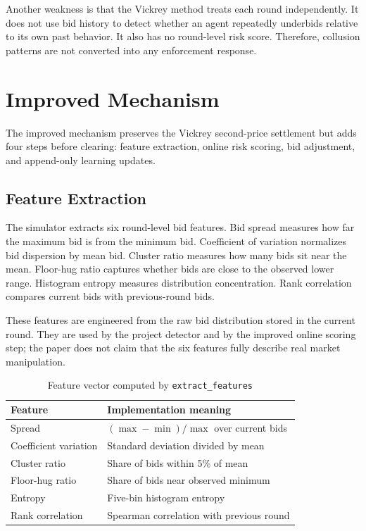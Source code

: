 \documentclass[conference]{IEEEtran}
\begin{document}
Another weakness is that the Vickrey method treats each round independently. It does not use bid history to detect whether an agent repeatedly underbids relative to its own past behavior. It also has no round-level risk score. Therefore, collusion patterns are not converted into any enforcement response.

\section{Improved Mechanism}
The improved mechanism preserves the Vickrey second-price settlement but adds four steps before clearing: feature extraction, online risk scoring, bid adjustment, and append-only learning updates.

\subsection{Feature Extraction}
The simulator extracts six round-level bid features. Bid spread measures how far the maximum bid is from the minimum bid. Coefficient of variation normalizes bid dispersion by mean bid. Cluster ratio measures how many bids sit near the mean. Floor-hug ratio captures whether bids are close to the observed lower range. Histogram entropy measures distribution concentration. Rank correlation compares current bids with previous-round bids.

These features are engineered from the raw bid distribution stored in the current round. They are used by the project detector and by the improved online scoring step; the paper does not claim that the six features fully describe real market manipulation.

\begin{table}[htbp]
\caption{Feature vector computed by \texttt{extract\_features}}
\label{tab:features}
\centering
\begin{tabular}{ll}
\toprule
\textbf{Feature} & \textbf{Implementation meaning} \\
\midrule
Spread & $(\max-\min)/\max$ over current bids \\
Coefficient variation & Standard deviation divided by mean \\
Cluster ratio & Share of bids within 5\% of mean \\
Floor-hug ratio & Share of bids near observed minimum \\
Entropy & Five-bin histogram entropy \\
Rank correlation & Spearman correlation with previous round \\
\bottomrule
\end{tabular}
\end{table}
\end{document}
